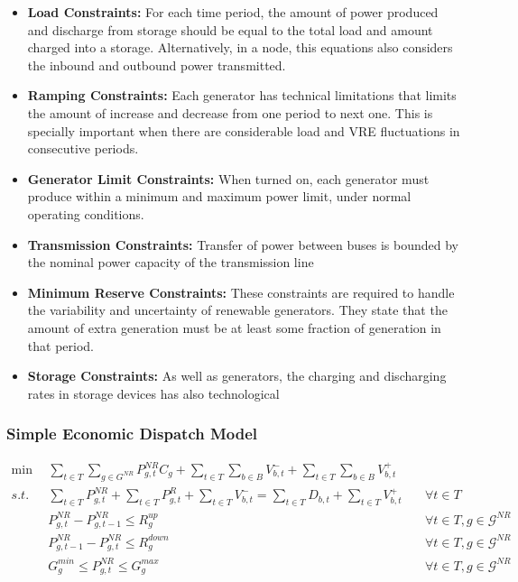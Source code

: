 \documentclass[12pt,LUDisStyle,twosided]{book}
\newcommand{\mc}{\mathcal}
\begin{document}
\begin{itemize}
\item \textbf{Load Constraints:} For each time period, the amount of power produced and discharge from storage should be equal to the total load and amount charged into a storage. Alternatively, in a node, this equations also considers the inbound and outbound power transmitted.
\item \textbf{Ramping Constraints:}  Each generator has technical limitations that limits the amount of increase and decrease from one period to next one. This is specially important when there are considerable load and VRE fluctuations in consecutive periods.
\item \textbf{Generator Limit Constraints:} When turned on, each generator must produce within a minimum and maximum power limit, under normal operating conditions.
\item \textbf{Transmission Constraints:} Transfer of power between buses is bounded by the nominal power capacity of the transmission line
\item \textbf{Minimum Reserve Constraints:} These constraints are required to handle the variability and uncertainty of renewable generators. They state that the amount of extra generation must be at least some fraction of generation in that period.
\item \textbf{Storage Constraints:} As well as generators, the charging and discharging rates in storage devices has also technological 


\end{itemize}

\subsubsection{Simple Economic Dispatch Model}

\begin{subequations}\label{model:simple_ED}
\begin{alignat}{4}
\min ~~& \sum_{t \in T}\sum_{g \in G^{NR}} P^{NR}_{g,t} C_{g} + \sum_{t \in T}\sum_{b \in B} V^{-}_{b,t} + \sum_{t \in T}\sum_{b \in B} V^{+}_{b,t} \label{eq:ObjectiveFunction} \\
s.t. ~~~& \sum_{t \in T} P^{NR}_{g,t} + \sum_{t \in T} P^{R}_{g,t} + \sum_{t \in T}V^{-}_{b,t} = \sum_{t \in T} D_{b,t}  + \sum_{t \in T}V^{+}_{b,t}  &~& \forall t \in T  \label{eq:loadBalanceConstraint} \\
& P^{NR}_{g,t} - P^{NR}_{g,t - 1} \leq R^{up}_{g} &~& \forall t \in T, g \in \mc{G}^{NR}\label{eq:rampUpRateConstraint} \\
& P^{NR}_{g,t -1 } - P^{NR}_{g,t} \leq R^{down}_{g} &~& \forall t \in T, g \in \mc{G}^{NR}\label{eq:rampDownRateConstraint} \\
& G^{min}_{g}\leq P^{NR}_{g,t} \leq G^{max}_{g} &~& \forall t \in T, g \in \mc{G}^{NR}\label{eq:generationBounds}
\end{alignat} 
\end{subequations}
\end{document}

